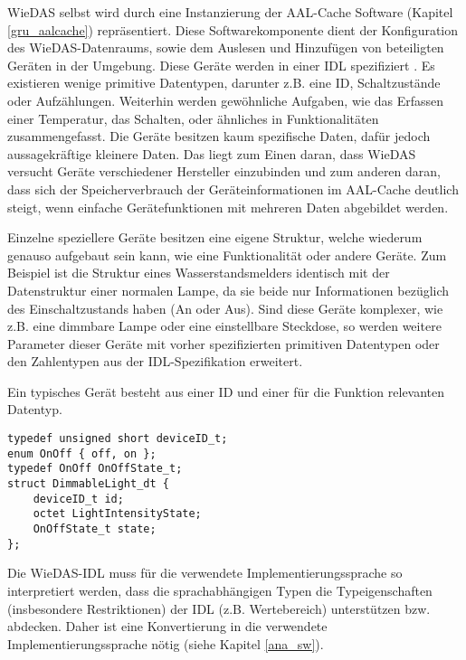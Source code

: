 WieDAS selbst wird durch eine Instanzierung der AAL-Cache Software (Kapitel \ref{gru_aalcache})
repräsentiert.
Diese Softwarekomponente dient der Konfiguration des WieDAS-Datenraums, sowie dem Auslesen und
Hinzufügen von beteiligten Geräten in der Umgebung.
Diese Geräte werden in einer IDL \cite{idl} spezifiziert \cite{wiedas_idl}.
Es existieren wenige primitive Datentypen, darunter z.B. eine ID, Schaltzustände oder Aufzählungen.
Weiterhin werden gewöhnliche Aufgaben, wie das Erfassen einer Temperatur, das Schalten, oder ähnliches
in Funktionalitäten zusammengefasst.
Die Geräte besitzen kaum spezifische Daten, dafür jedoch aussagekräftige kleinere Daten.
Das liegt zum Einen daran, dass WieDAS versucht Geräte verschiedener Hersteller einzubinden und zum
anderen daran, dass sich der Speicherverbrauch der Geräteinformationen im AAL-Cache deutlich steigt,
wenn einfache Gerätefunktionen mit mehreren Daten abgebildet werden.

Einzelne speziellere Geräte besitzen eine eigene Struktur, welche wiederum genauso aufgebaut sein
kann, wie eine Funktionalität oder andere Geräte.
Zum Beispiel ist die Struktur eines Wasserstandsmelders identisch mit der Datenstruktur einer
normalen Lampe, da sie beide nur Informationen bezüglich des Einschaltzustands haben (An oder Aus).
Sind diese Geräte komplexer, wie z.B. eine dimmbare Lampe oder eine einstellbare Steckdose, so werden
weitere Parameter dieser Geräte mit vorher spezifizierten primitiven Datentypen oder den
Zahlentypen aus der IDL-Spezifikation erweitert.

\begin{absolutelynopagebreak}
Ein typisches Gerät besteht aus einer ID und einer für die Funktion relevanten Datentyp.

\lstset{language=IDL}
\begin{lstlisting}[frame=single,caption={Gerätebeschreibung eines dimmbaren Lichts in WieDAS}]
typedef unsigned short deviceID_t;
enum OnOff { off, on };
typedef OnOff OnOffState_t;
struct DimmableLight_dt {
	deviceID_t id;
	octet LightIntensityState;
	OnOffState_t state;
};
\end{lstlisting}
\end{absolutelynopagebreak}

Die WieDAS-IDL muss für die verwendete Implementierungssprache so interpretiert werden, dass die
sprachabhängigen Typen die Typeigenschaften (insbesondere Restriktionen) der IDL (z.B. Wertebereich)
unterstützen bzw. abdecken.
Daher ist eine Konvertierung in die verwendete Implementierungssprache nötig (siehe Kapitel \ref{ana_sw}).

